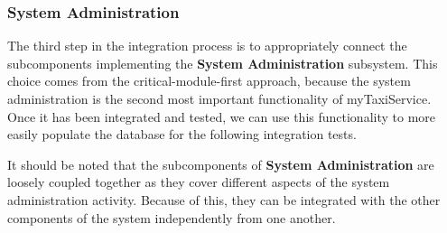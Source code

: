 \subsubsection*{System Administration}
The third step in the integration process is to appropriately connect the subcomponents implementing the \textbf{System Administration} subsystem. This choice comes from the critical-module-first approach, because the system administration is the second most important functionality of myTaxiService. Once it has been integrated and tested, we can use this functionality to more easily populate the database for the following integration tests.

It should be noted that the subcomponents of \textbf{System Administration} are loosely coupled together as they cover different aspects of the system administration activity. Because of this, they can be integrated with the other components of the system independently from one another. 

